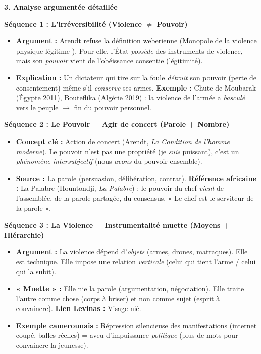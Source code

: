 \documentclass[11pt]{article}
\newcommand{\cle}[1]{{\popxbold\color{popdark}#1}}
\begin{document}
\begin{exoresolu}
\textbf{3. Analyse argumentée détaillée}

\textbf{Séquence 1 : L'irréversibilité (Violence $\neq$ Pouvoir)}
\begin{itemize}
    \item \textbf{Argument :} Arendt refuse la définition weberienne (\guillemotleft Monopole de la violence physique légitime \guillemotright). Pour elle, l'État \emph{possède} des instruments de violence, mais son \emph{pouvoir} vient de l'obéissance consentie (légitimité).
    \item \textbf{Explication :} Un dictateur qui tire sur la foule \emph{détruit} son pouvoir (perte de consentement) même s'il \emph{conserve} ses armes. \textbf{Exemple :} Chute de Moubarak (Égypte 2011), Bouteflika (Algérie 2019) : la violence de l'armée a \emph{basculé} vers le peuple $\rightarrow$ fin du pouvoir personnel.
\end{itemize}

\textbf{Séquence 2 : Le Pouvoir = Agir de concert (Parole + Nombre)}
\begin{itemize}
    \item \textbf{Concept clé :} \cle{Action de concert} (Arendt, \emph{La Condition de l'homme moderne}). Le pouvoir n'est pas une propriété (je \emph{suis} puissant), c'est un \emph{phénomène intersubjectif} (nous \emph{avons} du pouvoir ensemble).
    \item \textbf{Source :} La \cle{parole} (persuasion, délibération, contrat). \textbf{Référence africaine :} La \cle{Palabre} (Hountondji, \emph{La Palabre}) : le pouvoir du chef \emph{vient} de l'assemblée, de la parole partagée, du consensus. « Le chef est le serviteur de la parole ».
\end{itemize}

\textbf{Séquence 3 : La Violence = Instrumentalité muette (Moyens + Hiérarchie)}
\begin{itemize}
    \item \textbf{Argument :} La violence dépend d'\emph{objets} (armes, drones, matraques). Elle est \cle{technique}. Elle impose une relation \emph{verticale} (celui qui tient l'arme / celui qui la subit).
    \item \textbf{« Muette » :} Elle nie la \cle{parole} (argumentation, négociation). Elle traite l'autre comme \cle{chose} (corps à briser) et non comme \cle{sujet} (esprit à convaincre). \textbf{Lien Levinas :} Visage nié.
    \item \textbf{Exemple camerounais :} Répression silencieuse des manifestations (internet coupé, balles réelles) = aveu d'impuissance \emph{politique} (plus de mots pour convaincre la jeunesse).
\end{itemize}


\end{exoresolu}
\end{document}
